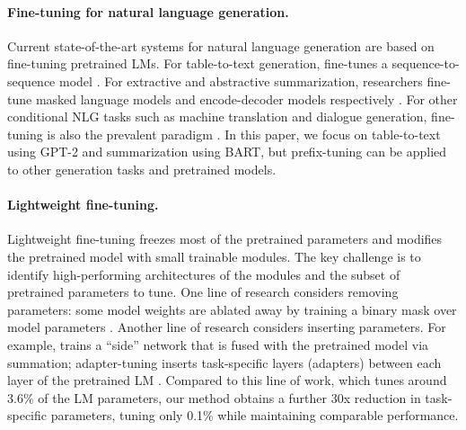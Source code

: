 \documentclass[11pt,a4paper]{article}
\newcommand\pl[1]{\textcolor{red}{[PL: #1]}}
\begin{document}
\paragraph{Fine-tuning for natural language generation.} 
Current state-of-the-art systems for natural language generation are based on fine-tuning pretrained LMs. 
For table-to-text generation, \citet{kale2020texttotext} fine-tunes a sequence-to-sequence model \citep[T5;][]{T5}. 
For extractive and abstractive summarization, researchers fine-tune masked language models \citep[e.g., BERT;][]{devlin-etal-2019-bert} and encode-decoder models \citep[e.g., BART;][]{lewis-etal-2020-bart}  respectively \cite{zhong-etal-2020-extractive, liu-lapata-2019-text,T5}.
For other conditional NLG tasks such as machine translation and dialogue generation, fine-tuning is also the prevalent paradigm \cite{zhang-etal-2020-dialogpt, stickland2020recipes, Zhu2020Incorporating, liu2020multilingual}. 
In this paper, we focus on table-to-text using GPT-2 and summarization using BART, but prefix-tuning can be applied to other generation tasks and pretrained models.


\paragraph{Lightweight fine-tuning.}
Lightweight fine-tuning freezes most of the pretrained parameters and modifies the pretrained model with small trainable modules. The key challenge is to identify high-performing architectures of the modules and the subset of pretrained parameters to tune. 
One line of research considers removing parameters: some model weights are ablated away by training a binary mask over model parameters \cite{zhao2020masking,dixit2020How}.
Another line of research considers inserting parameters.
For example, \citet{zhang2020sidetuning} trains a ``side'' network that is fused with the pretrained model via summation; adapter-tuning inserts task-specific layers (adapters) between each layer of the pretrained LM \cite{pmlr-v97-houlsby19a,lin-etal-2020-exploring,Rebuffi2017Adapter,pfeiffer2020adapterfusion}.
Compared to this line of work, which tunes around $3.6\%$ of the LM parameters, our method obtains a further 30x reduction in task-specific parameters, tuning only 0.1\% while maintaining comparable performance. 
\end{document}
